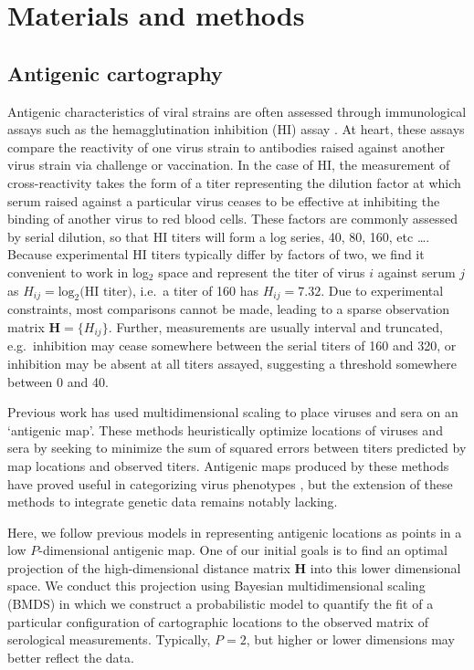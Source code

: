 \documentclass[11pt,oneside,letterpaper]{article}
\begin{document}
\section*{Materials and methods}

\subsection*{Antigenic cartography}

Antigenic characteristics of viral strains are often assessed through immunological assays such as the hemagglutination inhibition (HI) assay \cite{Hirst43}.  
At heart, these assays compare the reactivity of one virus strain to antibodies raised against another virus strain via challenge or vaccination.  
In the case of HI, the measurement of cross-reactivity takes the form of a titer representing the dilution factor at which serum raised against a particular virus ceases to be effective at inhibiting the binding of another virus to red blood cells.  
These factors are commonly assessed by serial dilution, so that HI titers will form a log series, 40, 80, 160, etc \dots.
Because experimental HI titers typically differ by factors of two, we find it convenient to work in log$_2$ space and represent the titer of virus $i$ against serum $j$ as $H_{ij} = \mathrm{log}_2 \mbox{(HI titer)}$, i.e.\ a titer of 160 has $H_{ij} = 7.32$.
Due to experimental constraints, most comparisons cannot be made, leading to a sparse observation matrix $\mathbf{H} = \{H_{ij}\}$.  
Further, measurements are usually interval and truncated, e.g.\ inhibition may cease somewhere between the serial titers of 160 and 320, or inhibition may be absent at all titers assayed, suggesting a threshold somewhere between 0 and 40.  

Previous work \cite{Smith04, Cai10} has used multidimensional scaling to place viruses and sera on an `antigenic map'.  
These methods heuristically optimize locations of viruses and sera by seeking to minimize the sum of squared errors between titers predicted by map locations and observed titers.  
Antigenic maps produced by these methods have proved useful in categorizing virus phenotypes \cite{Smith04}, but the extension of these methods to integrate genetic data remains notably lacking.

Here, we follow previous models in representing antigenic locations as points in a low $P$-dimensional antigenic map. 
One of our initial goals is to find an optimal projection of the high-dimensional distance matrix $\mathbf{H}$ into this lower dimensional space. 
We conduct this projection using Bayesian multidimensional scaling (BMDS) \cite{Oh01} in which we construct a probabilistic model to quantify the fit of a particular configuration of cartographic locations to the observed matrix of serological measurements.
Typically, $P = 2$, but higher or lower dimensions may better reflect the data. 
\end{document}
